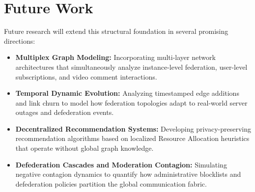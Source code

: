 \documentclass[conference]{IEEEtran}
\begin{document}
\section{Future Work}

Future research will extend this structural foundation in several promising directions:
\begin{itemize}
    \item \textbf{Multiplex Graph Modeling:} Incorporating multi-layer network architectures that simultaneously analyze instance-level federation, user-level subscriptions, and video comment interactions.
    \item \textbf{Temporal Dynamic Evolution:} Analyzing timestamped edge additions and link churn to model how federation topologies adapt to real-world server outages and defederation events.
    \item \textbf{Decentralized Recommendation Systems:} Developing privacy-preserving recommendation algorithms based on localized Resource Allocation heuristics that operate without global graph knowledge.
    \item \textbf{Defederation Cascades and Moderation Contagion:} Simulating negative contagion dynamics to quantify how administrative blocklists and defederation policies partition the global communication fabric.
\end{itemize}
\end{document}
